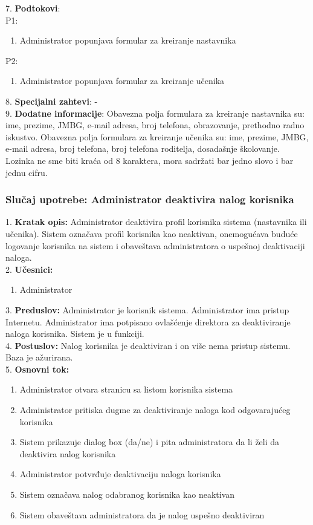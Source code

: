 \documentclass{article}
\begin{document}
7. \textbf{Podtokovi}: \\
P1:
\begin{enumerate} [label=(\alph*)]
\item Administrator popunjava formular za kreiranje nastavnika
\end{enumerate}
P2:
\begin{enumerate} [label=(\alph*)]
\item Administrator popunjava formular za kreiranje učenika
\end{enumerate}

8. \textbf{Specijalni zahtevi}: - \\

9. \textbf{Dodatne informacije}: Obavezna polja formulara za kreiranje nastavnika su: ime, prezime, JMBG, e-mail adresa, broj telefona, obrazovanje, prethodno radno iskustvo. Obavezna polja formulara za kreiranje učenika su: ime, prezime, JMBG, e-mail adresa, broj telefona, broj telefona roditelja, dosadašnje školovanje. Lozinka ne sme biti kraća od 8 karaktera, mora sadržati bar jedno slovo i bar jednu cifru. \\

\subsubsection{Slučaj upotrebe: Administrator deaktivira nalog korisnika}
1. \textbf{Kratak opis:} Administrator deaktivira profil korisnika sistema (nastavnika ili učenika). Sistem označava profil korisnika kao neaktivan, onemogućava buduće logovanje korisnika na sistem i obaveštava administratora o uspešnoj deaktivaciji naloga. \\

2. \textbf{Učesnici:}
\begin{enumerate} [label=(\alph*)]
\item Administrator
\end{enumerate} 

3. \textbf{Preduslov:} Administrator je korisnik sistema. Administrator ima pristup Internetu. Administrator ima potpisano ovlašćenje direktora za deaktiviranje naloga korisnika. Sistem je u funkciji. \\

4. \textbf{Postuslov:} Nalog korisnika je deaktiviran i on više nema pristup sistemu. Baza je ažurirana. \\

5. \textbf{Osnovni tok:} 
\begin{enumerate} [label=(\alph*)]
\item Administrator otvara stranicu sa listom korisnika sistema
\item Administrator pritiska dugme za deaktiviranje naloga kod odgovarajućeg korisnika
\item Sistem prikazuje dialog box (da/ne) i pita administratora da li želi da deaktivira nalog korisnika
\item Administrator potvrđuje deaktivaciju naloga korisnika
\item Sistem označava nalog odabranog korisnika kao neaktivan
\item Sistem obaveštava administratora da je nalog uspešno deaktiviran
\end{enumerate}
\end{document}
